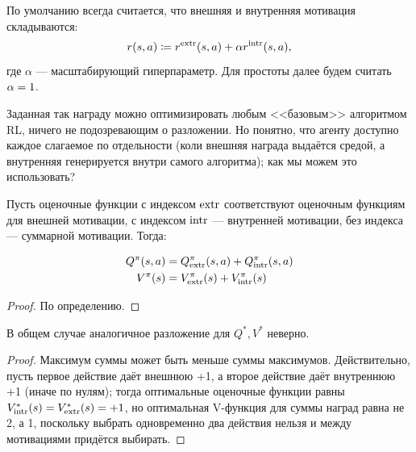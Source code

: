 По умолчанию всегда считается, что внешняя и внутренняя мотивация складываются:
\begin{equation}\label{sumgoal}
r(s, a) \coloneqq r^{\mathrm{extr}}(s, a) + \alpha r^{\mathrm{intr}}(s, a),
\end{equation}
где $\alpha$ --- масштабирующий гиперпараметр. Для простоты далее будем считать $\alpha \HM= 1$.

Заданная так награду можно оптимизировать любым <<базовым>> алгоритмом RL, ничего не подозревающим о разложении. Но понятно, что агенту доступно каждое слагаемое по отдельности (коли внешняя награда выдаётся средой, а внутренняя генерируется внутри самого алгоритма); как мы можем это использовать?

Пусть оценочные функции с индексом $\mathrm{extr}$ соответствуют оценочным функциям для внешней мотивации, с индексом $\mathrm{intr}$ --- внутренней мотивации, без индекса --- суммарной мотивации. Тогда:
\begin{proposition}
\begin{equation}\label{valuefunctionssum}
\begin{aligned}
Q^\pi(s, a) &= Q^\pi_{\mathrm{extr}}(s, a) + Q^\pi_{\mathrm{intr}}(s, a) \\
V^\pi(s) &= V^\pi_{\mathrm{extr}}(s) + V^\pi_{\mathrm{intr}}(s)
\end{aligned}
\end{equation}
\begin{proof}
По определению.
\end{proof}
\end{proposition}

\begin{proposition}
В общем случае аналогичное разложение для $Q^*, V^*$ неверно.
\begin{proof}
Максимум суммы может быть меньше суммы максимумов. Действительно, пусть первое действие даёт внешнюю +1, а второе действие даёт внутреннюю +1 (иначе по нулям); тогда оптимальные оценочные функции равны $V^*_{\mathrm{intr}}(s) = V^*_{\mathrm{extr}}(s) = +1$, но оптимальная V-функция для суммы наград равна не 2, а 1, поскольку выбрать одновременно два действия нельзя и между мотивациями придётся выбирать.
\end{proof}
\end{proposition}


